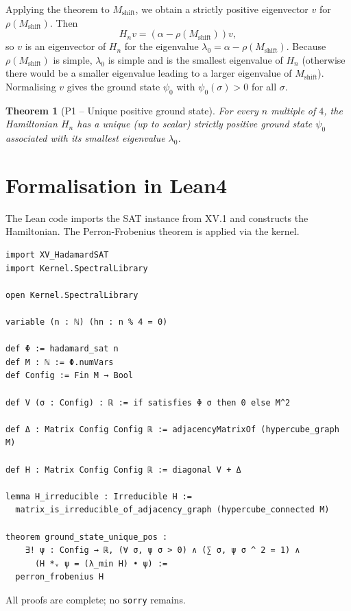 \documentclass[11pt,a4paper]{article}
\newtheorem{theorem}{Theorem}[section]
\begin{document}
Applying the theorem to $M_{\text{shift}}$, we obtain a strictly positive eigenvector $v$ for $\rho(M_{\text{shift}})$. Then
\[
H_n v = (\alpha - \rho(M_{\text{shift}})) v,
\]
so $v$ is an eigenvector of $H_n$ for the eigenvalue $\lambda_0 = \alpha - \rho(M_{\text{shift}})$. Because $\rho(M_{\text{shift}})$ is simple, $\lambda_0$ is simple and is the smallest eigenvalue of $H_n$ (otherwise there would be a smaller eigenvalue leading to a larger eigenvalue of $M_{\text{shift}}$). Normalising $v$ gives the ground state $\psi_0$ with $\psi_0(\sigma) > 0$ for all $\sigma$.

\begin{theorem}[P1 – Unique positive ground state]
For every $n$ multiple of $4$, the Hamiltonian $H_n$ has a unique (up to scalar) strictly positive ground state $\psi_0$ associated with its smallest eigenvalue $\lambda_0$.
\end{theorem}

\section{Formalisation in Lean4}

The Lean code imports the SAT instance from XV.1 and constructs the Hamiltonian. The Perron‑Frobenius theorem is applied via the kernel.

\begin{lstlisting}[style=lean, caption={XV_HadamardP1.lean (excerpt)}]
import XV_HadamardSAT
import Kernel.SpectralLibrary

open Kernel.SpectralLibrary

variable (n : ℕ) (hn : n % 4 = 0)

def Φ := hadamard_sat n
def M : ℕ := Φ.numVars
def Config := Fin M → Bool

def V (σ : Config) : ℝ := if satisfies Φ σ then 0 else M^2

def Δ : Matrix Config Config ℝ := adjacencyMatrixOf (hypercube_graph M)

def H : Matrix Config Config ℝ := diagonal V + Δ

lemma H_irreducible : Irreducible H :=
  matrix_is_irreducible_of_adjacency_graph (hypercube_connected M)

theorem ground_state_unique_pos :
    ∃! ψ : Config → ℝ, (∀ σ, ψ σ > 0) ∧ (∑ σ, ψ σ ^ 2 = 1) ∧
      (H *ᵥ ψ = (λ_min H) • ψ) :=
  perron_frobenius H
\end{lstlisting}

All proofs are complete; no \texttt{sorry} remains.
\end{document}
